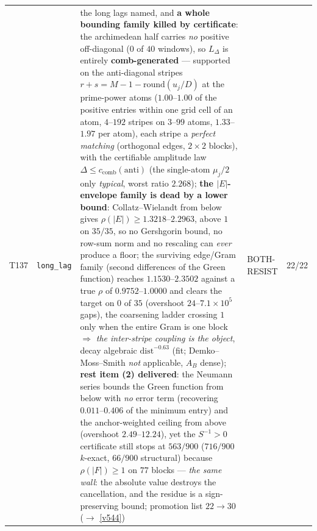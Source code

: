 \documentclass[11pt,a4paper]{article}
\begin{document}
{\begin{xltabular}{\linewidth}{@{}p{0.95cm} >{\raggedright\arraybackslash}p{3.1cm} Y >{\raggedright\scriptsize\arraybackslash}p{3.35cm} p{1.15cm}@{}}
T137 & \texttt{\scriptsize long\_\allowbreak lag} & the long lags named, and \textbf{a whole bounding family killed by certificate}: the archimedean half carries \emph{no} positive off-diagonal ($0$ of $40$ windows), so $L_\Delta$ is entirely \textbf{comb-generated} --- supported on the anti-diagonal stripes $r+s=M-1-\mathrm{round}(u_j/D)$ at the prime-power atoms ($1.00$--$1.00$ of the positive entries within one grid cell of an atom, $4$--$192$ stripes on $3$--$99$ atoms, $1.33$--$1.97$ per atom), each stripe a \emph{perfect matching} (orthogonal edges, $2\times2$ blocks), with the certifiable amplitude law $\Delta\le c_{\mathrm{comb}}(\mathrm{anti})$ (the single-atom $\mu_j/2$ only \emph{typical}, worst ratio $2.268$); \textbf{the $|E|$-envelope family is dead by a lower bound}: Collatz--Wielandt from below gives $\rho(|E|)\ge1.3218$--$2.2963$, above $1$ on $35/35$, so no Gershgorin bound, no row-sum norm and no rescaling can \emph{ever} produce a floor; the surviving edge/Gram family (second differences of the Green function) reaches $1.1530$--$2.3502$ against a true $\rho$ of $0.9752$--$1.0000$ and clears the target on $0$ of $35$ (overshoot $24$--$7.1\times10^{5}$ gaps), the coarsening ladder crossing $1$ only when the entire Gram is one block $\Rightarrow$ \emph{the inter-stripe coupling is the object}, decay algebraic $\mathrm{dist}^{-0.63}$ (fit; Demko--Moss--Smith \emph{not} applicable, $A_B$ dense); \textbf{rest item (2) delivered}: the Neumann series bounds the Green function from below with \emph{no} error term (recovering $0.011$--$0.406$ of the minimum entry) and the anchor-weighted ceiling from above (overshoot $2.49$--$12.24$), yet the $S^{-1}>0$ certificate still stops at $563/900$ ($716/900$ $k$-exact, $66/900$ structural) because $\rho(|F|)\ge1$ on $77$ blocks --- \emph{the same wall}: the absolute value destroys the cancellation, and the residue is a sign-preserving bound; promotion list $22\to30$ ($\to$ \vref{v544}) & BOTH-RESIST & 22/22\\

\end{xltabular}}
\end{document}
